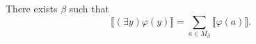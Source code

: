 There exists $\beta$ such that
$$
\llbracket (\exists y)\varphi(y) \rrbracket = \sum_{a \in M_{\beta}} \llbracket \varphi(a) \rrbracket.
$$
